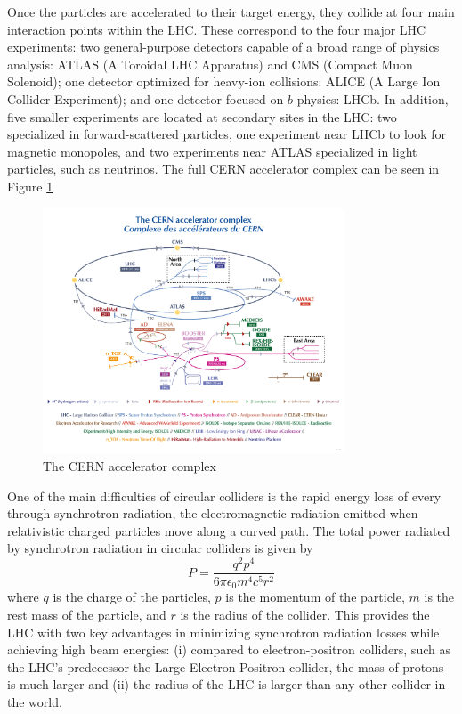 Once the particles are accelerated to their target energy, they collide at four main interaction points within the LHC. These correspond to the four major LHC experiments: two general-purpose detectors capable of a broad range of physics analysis: ATLAS (A Toroidal LHC Apparatus) and CMS (Compact Muon Solenoid); one detector optimized for heavy-ion collisions: ALICE (A Large Ion Collider Experiment); and one detector focused on $b$-physics: LHCb. In addition, five smaller experiments are located at secondary sites in the LHC: two specialized in forward-scattered particles, one experiment near LHCb to look for magnetic monopoles, and two experiments near ATLAS specialized in light particles, such as neutrinos. The full CERN accelerator complex can be seen in Figure \ref{fig:cern-accelerator-complex}

\begin{figure}[htbp]
    \centering
    \includegraphics[width=0.8\textwidth]{figures/chapter3/CERN-accelerator-complex.png}
    \caption{The CERN accelerator complex \cite{ref:Lopienska}}
    \label{fig:cern-accelerator-complex}
\end{figure}


One of the main difficulties of circular colliders is the rapid energy loss of every through synchrotron radiation, the electromagnetic radiation emitted when relativistic charged particles move along a curved path. The total power radiated by synchrotron radiation in circular colliders is given by
\begin{equation}
    P = \frac{q^2p^4}{6 \pi \epsilon_0 m^4 c^5 r^2}
\end{equation}
where $q$ is the charge of the particles, $p$ is the momentum of the particle, $m$ is the rest mass of the particle, and $r$ is the radius of the collider. This provides the LHC with two key advantages in minimizing synchrotron radiation losses while achieving high beam energies: (i) compared to electron-positron colliders, such as the LHC's predecessor the Large Electron-Positron collider, the mass of protons is much larger and (ii) the radius of the LHC is larger than any other collider in the world. 

